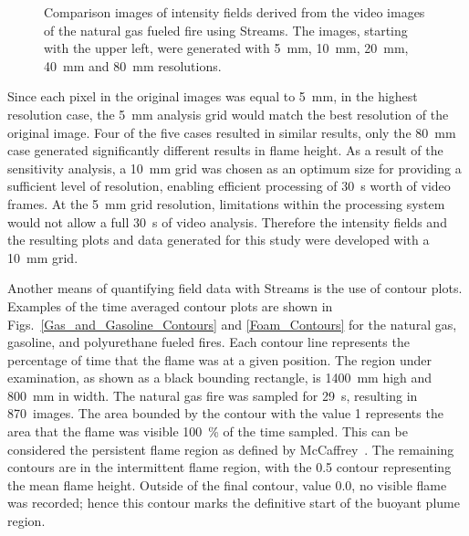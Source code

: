 \documentclass[twoside]{uocthesis}
\begin{document}
{\begin{figure}[p]
	 \caption[Comparison images of intensity fields derived from the video images of the natural gas fueled fire]{Comparison images of intensity fields derived from the video images of the natural gas fueled fire using Streams. The images, starting with the upper left, were generated with 5~mm, 10~mm, 20~mm, 40~mm and 80~mm resolutions.}
	 \label{Intensity}
\end{figure}

Since each pixel in the original images was equal to 5~mm, in the highest resolution case, the 5~mm analysis grid would match the best resolution of the original image.  Four of the five cases resulted in similar results, only the 80~mm case generated significantly different results in flame height.  As a result of the sensitivity analysis, a 10~mm grid was chosen as an optimum size for providing a sufficient level of resolution, enabling efficient processing of 30~s worth of video frames.  At the 5~mm grid resolution, limitations within the processing system would not allow a full 30~s of video analysis.  Therefore the intensity fields and the resulting plots and data generated for this study were developed with a 10~mm grid.

Another means of quantifying field data with Streams is the use of contour plots.  Examples of the time averaged contour plots are shown in Figs.~\ref{Gas_and_Gasoline_Contours} and \ref{Foam_Contours} for the natural gas, gasoline, and polyurethane fueled fires.  Each contour line represents the percentage of time that the flame was at a given position. The region under examination, as shown as a black bounding rectangle, is 1400~mm high and 800~mm in width.  The natural gas fire was sampled for 29~s, resulting in 870~images. The area bounded by the contour with the value 1 represents the area that the flame was visible 100~\% of the time sampled. This can be considered the persistent flame region as defined by McCaffrey~\cite{McCaffrey:1979}. The remaining contours are in the intermittent flame region, with the 0.5 contour representing the mean flame height. Outside of the final contour, value 0.0, no visible flame was recorded; hence this contour marks the definitive start of the buoyant plume region.

}
\end{document}

